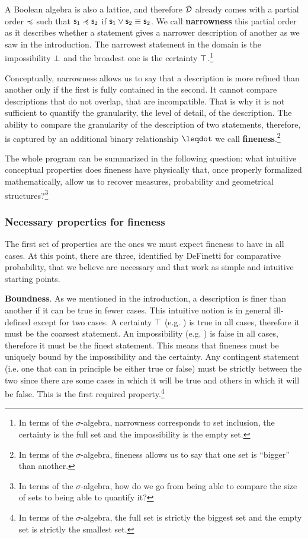 \documentclass[11pt]{article}
\begin{document}
A Boolean algebra is also a lattice, and therefore $\bar{\mathcal{D}}$ already comes with a partial order $\preccurlyeq$ such that $\mathsf{s}_1 \preccurlyeq \mathsf{s}_2$ if $\mathsf{s}_1 \vee \mathsf{s}_2 \equiv \mathsf{s}_2$. We call \textbf{narrowness} this partial order as it describes whether a statement gives a narrower description of another as we saw in the introduction. The narrowest statement in the domain is the impossibility $\bot$ and the broadest one is the certainty $\top$.\footnote{In terms of the $\sigma$-algebra, narrowness corresponds to set inclusion, the certainty is the full set and the impossibility is the empty set.}

Conceptually, narrowness allows us to say that a description is more refined than another only if the first is fully contained in the second. It cannot compare descriptions that do not overlap, that are incompatible. That is why it is not sufficient to quantify the granularity, the level of detail, of the description. The ability to compare the granularity of the description of two statements, therefore, is captured by an additional binary relationship $\finer$ we call \textbf{fineness}.\footnote{In terms of the $\sigma$-algebra, fineness allows us to say that one set is ``bigger'' than another.}

The whole program can be summarized in the following question: what intuitive conceptual properties does fineness have physically that, once properly formalized mathematically, allow us to recover measures, probability and geometrical structures?\footnote{In terms of the $\sigma$-algebra, how do we go from being able to compare the size of sets to being able to quantify it?}

\subsubsection{Necessary properties for fineness}

The first set of properties are the ones we must expect fineness to have in all cases. At this point, there are three, identified by DeFinetti\cite{definetti} for comparative probability, that we believe are necessary and that work as simple and intuitive starting points.

\textbf{Boundness}. As we mentioned in the introduction, a description is finer than another if it can be true in fewer cases. This intuitive notion is in general ill-defined except for two cases. A certainty $\top$ (e.g. ) is true in all cases, therefore it must be the coarsest statement. An impossibility (e.g. ) is false in all cases, therefore it must be the finest statement. This means that fineness must be uniquely bound by the impossibility and the certainty. Any contingent statement (i.e. one that can in principle be either true or false) must be strictly between the two since there are some cases in which it will be true and others in which it will be false. This is the first required property.\footnote{In terms of the $\sigma$-algebra, the full set is strictly the biggest set and the empty set is strictly the smallest set.}
\end{document}
